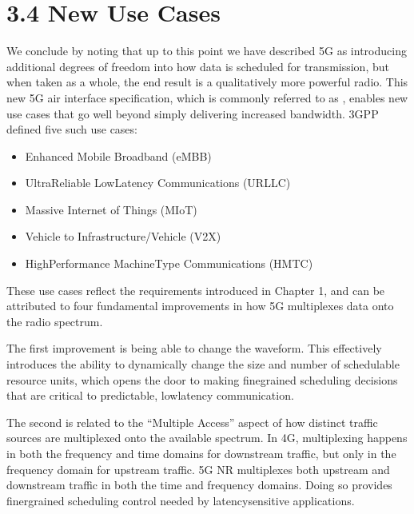 \documentclass[a4paper,11pt,english]{sphinxmanual}
\begin{document}
\section{3.4 New Use Cases}
\label{\detokenize{radio:new-use-cases}}
\sphinxAtStartPar
We conclude by noting that up to this point we have described 5G as
introducing additional degrees of freedom into how data is scheduled
for transmission, but when taken as a whole, the end result is a
qualitatively more powerful radio. This new 5G air interface
specification, which is commonly referred to as ,
enables new use cases that go well beyond simply delivering
increased bandwidth. 3GPP defined five such use cases:
\begin{itemize}
\item {} 
\sphinxAtStartPar
Enhanced Mobile Broadband (eMBB)

\item {} 
\sphinxAtStartPar
Ultra\sphinxhyphen{}Reliable Low\sphinxhyphen{}Latency Communications (URLLC)

\item {} 
\sphinxAtStartPar
Massive Internet of Things (MIoT)

\item {} 
\sphinxAtStartPar
Vehicle to Infrastructure/Vehicle (V2X)

\item {} 
\sphinxAtStartPar
High\sphinxhyphen{}Performance Machine\sphinxhyphen{}Type Communications (HMTC)

\end{itemize}

\sphinxAtStartPar
These use cases reflect the requirements introduced in Chapter 1, and
can be attributed to four fundamental improvements in how 5G
multiplexes data onto the radio spectrum.

\sphinxAtStartPar
The first improvement is being able to change the waveform. This effectively
introduces the ability to dynamically change the size and number of
schedulable resource units, which opens the door to making fine\sphinxhyphen{}grained
scheduling decisions that are critical to predictable, low\sphinxhyphen{}latency
communication.

\sphinxAtStartPar
The second is related to the “Multiple Access” aspect of how distinct
traffic sources are multiplexed onto the available spectrum. In 4G,
multiplexing happens in both the frequency and time domains for
downstream traffic, but only in  the frequency
domain for upstream traffic. 5G NR multiplexes both upstream and
downstream traffic in both the time and frequency domains. Doing so
provides finer\sphinxhyphen{}grained scheduling control needed by latency\sphinxhyphen{}sensitive
applications.
\end{document}
